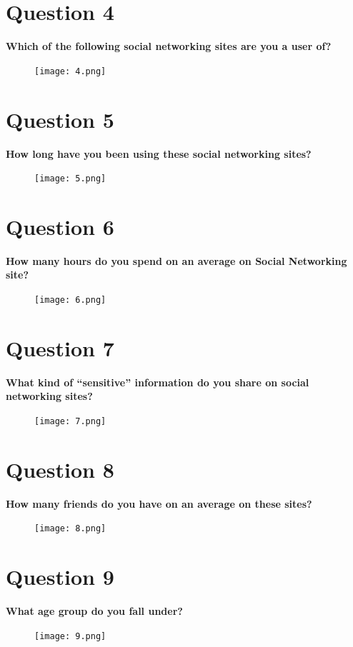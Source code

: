 \documentclass[11pt]{book}
\begin{document}
\newpage
\chapter{Question 4}
\textbf{Which of the following social networking sites are you a user of?
}
\begin{figure}[ht!]
	\centering
	\texttt{[image: 4.png]}
	\label{overflow}
\end{figure}

\newpage
\chapter{Question 5}
\textbf{How long have you been using these social networking sites?
}
\begin{figure}[ht!]
	\centering
	\texttt{[image: 5.png]}
	\label{overflow}
\end{figure}

\newpage
\chapter{Question 6}
\textbf{How many hours do you spend on an average on Social Networking site?
}
\begin{figure}[ht!]
	\centering
	\texttt{[image: 6.png]}
	\label{overflow}
\end{figure}

\newpage
\chapter{Question 7}
\textbf{What kind of ``sensitive'' information do you share on social networking sites?
}
\begin{figure}[ht!]
	\centering
	\texttt{[image: 7.png]}
	\label{overflow}
\end{figure}

\newpage
\chapter{Question 8}
\textbf{How many friends do you have on an average on these sites?
}
\begin{figure}[ht!]
	\centering
	\texttt{[image: 8.png]}
	\label{overflow}
\end{figure}

\newpage
\chapter{Question 9}
\textbf{What age group do you fall under?}
\begin{figure}[ht!]
	\centering
	\texttt{[image: 9.png]}
	\label{overflow}
\end{figure}
\end{document}
